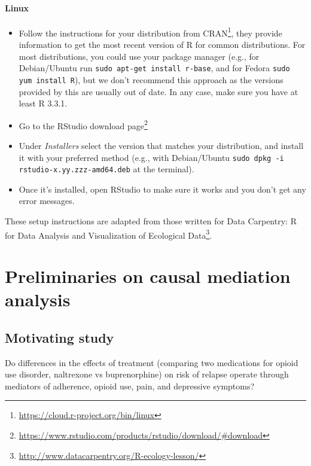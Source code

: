 \documentclass[
  12pt,
]{book}
\newcommand{\passthrough}[1]{#1}
\providecommand{\tightlist}{%
  \setlength{\itemsep}{0pt}\setlength{\parskip}{0pt}}
\renewcommand{\href}[2]{#2\footnote{\url{#1}}}
\theoremstyle{definition}
\theoremstyle{definition}
\theoremstyle{definition}
\newcommand{\1}{\mathbbm{1}}
\begin{document}
\hypertarget{linux}{%
\subsubsection{Linux}\label{linux}}

\begin{itemize}
\tightlist
\item
  Follow the instructions for your distribution
  from \href{https://cloud.r-project.org/bin/linux}{CRAN}, they provide information
  to get the most recent version of R for common distributions. For most
  distributions, you could use your package manager (e.g., for Debian/Ubuntu run
  \passthrough{\lstinline!sudo apt-get install r-base!}, and for Fedora \passthrough{\lstinline!sudo yum install R!}), but we
  don't recommend this approach as the versions provided by this are
  usually out of date. In any case, make sure you have at least R 3.3.1.
\item
  Go to the \href{https://www.rstudio.com/products/rstudio/download/\#download}{RStudio download
  page}
\item
  Under \emph{Installers} select the version that matches your distribution, and
  install it with your preferred method (e.g., with Debian/Ubuntu \passthrough{\lstinline!sudo dpkg -i rstudio-x.yy.zzz-amd64.deb!} at the terminal).
\item
  Once it's installed, open RStudio to make sure it works and you don't get any
  error messages.
\end{itemize}

These setup instructions are adapted from those written for \href{http://www.datacarpentry.org/R-ecology-lesson/}{Data Carpentry: R
for Data Analysis and Visualization of Ecological
Data}.

\hypertarget{mediation}{%
\chapter{Preliminaries on causal mediation analysis}\label{mediation}}

\hypertarget{motivating-study}{%
\section{Motivating study}\label{motivating-study}}

Do differences in the effects of treatment (comparing two medications for opioid use disorder, naltrexone vs buprenorphine) on risk of relapse operate through mediators of adherence, opioid use, pain, and depressive symptoms? \citep{rudolph2020explaining}
\end{document}
